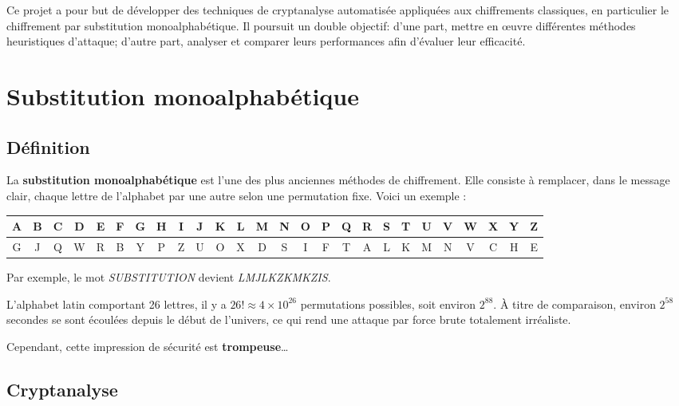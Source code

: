 \documentclass[a4paper]{article}
\begin{document}
Ce projet a pour but de développer des techniques de cryptanalyse automatisée appliquées aux chiffrements classiques, en particulier le chiffrement par substitution monoalphabétique. Il poursuit un double objectif: d’une part, mettre en œuvre différentes méthodes heuristiques d’attaque; d’autre part, analyser et comparer leurs performances afin d’évaluer leur efficacité.

\section{Substitution monoalphabétique}

\subsection{Définition}

La \textbf{substitution monoalphabétique} est l’une des plus anciennes méthodes de chiffrement. Elle consiste à remplacer, dans le message clair, chaque lettre de l’alphabet par une autre selon une permutation fixe. Voici un exemple :

\vspace{1em}
    \begin{adjustbox}{width=\textwidth,center}
        \begin{tabular}{|c|c|c|c|c|c|c|c|c|c|c|c|c|c|c|c|c|c|c|c|c|c|c|c|c|c|}
        \hline
        A & B & C & D & E & F & G & H & I & J & K & L & M & N & O & P & Q & R & S & T & U & V & W & X & Y & Z \\
        \hline
        G & J & Q & W & R & B & Y & P & Z & U & O & X & D & S & I & F & T & A & L & K & M & N & V & C & H & E \\
        \hline
        \end{tabular}
    \end{adjustbox}
\vspace{1em}

Par exemple, le mot \textit{SUBSTITUTION} devient  \textit{LMJLKZKMKZIS}.

L’alphabet latin comportant 26 lettres, il y a $26! \approx 4 \times 10^{26}$ permutations possibles, soit environ $2^{88}$. À titre de comparaison, environ $2^{58}$ secondes se sont écoulées depuis le début de l’univers, ce qui rend une attaque par force brute totalement irréaliste.

Cependant, cette impression de sécurité est \textbf{trompeuse}\ldots

\subsection{Cryptanalyse}
\end{document}
